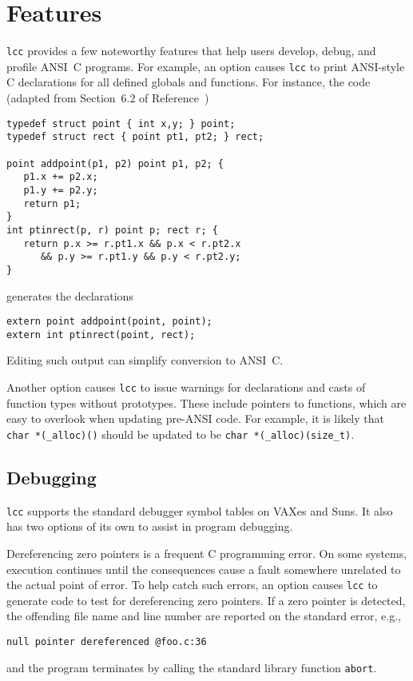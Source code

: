\section{Features}

\verb|lcc| provides a few noteworthy features that help users develop,
debug, and profile ANSI~C programs.
For example, an option causes
\verb|lcc| to print ANSI-style C declarations for all defined globals and functions.
For instance, the code (adapted from Section~6.2 of Reference~\cite{kernighan:ritchie:88})
\begin{verbatim}
typedef struct point { int x,y; } point;
typedef struct rect { point pt1, pt2; } rect;

point addpoint(p1, p2) point p1, p2; {
   p1.x += p2.x;
   p1.y += p2.y;
   return p1;
}
int ptinrect(p, r) point p; rect r; {
   return p.x >= r.pt1.x && p.x < r.pt2.x
      && p.y >= r.pt1.y && p.y < r.pt2.y;
}
\end{verbatim}
generates the declarations
\begin{verbatim}
extern point addpoint(point, point);
extern int ptinrect(point, rect);
\end{verbatim}
Editing such output can simplify conversion to ANSI~C.

Another option causes \verb|lcc| to
issue warnings for declarations and casts of function types without prototypes.
These include pointers to functions, which are easy to overlook
when updating pre-ANSI code. For example, it is likely
that \verb|char *(_alloc)()| should
be updated to be \verb|char *(_alloc)(size_t)|.

\subsection{Debugging}

\verb|lcc| supports the standard debugger symbol tables on VAXes and Suns.
It also has two options of its own to assist in program debugging.

Dereferencing zero pointers is a frequent C programming error.
On some systems, execution continues until the consequences
cause a fault somewhere unrelated to the actual point of error.
To help catch such errors, an option causes \verb|lcc|
to generate code to test for dereferencing zero pointers. If a zero pointer
is detected, the offending file name and line number are reported on the standard error, e.g.,
\begin{verbatim}
null pointer dereferenced @foo.c:36
\end{verbatim}
and the program terminates by calling the standard library function \verb|abort|.

